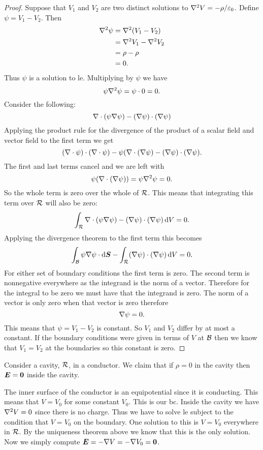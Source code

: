     \begin{proof}
        Suppose that \(V_1\) and \(V_2\) are two distinct solutions to \(\nabla^2 V = -\rho/\varepsilon_0\).
        Define \(\psi = V_1 - V_2\).
        Then
        \begin{align*}
            \nabla^2 \psi &= \nabla^2(V_1 - V_2)\\
            &= \nabla^2 V_1 - \nabla^2 V_2\\
            &= \rho - \rho\\
            &= 0.
        \end{align*}
        Thus \(\psi\) is a solution to \acrshort{le}.
        Multiplying by \(\psi\) we have
        \[\psi\nabla^2\psi = \psi\cdot0 = 0.\]
        Consider the following:
        \[\nabla\cdot(\psi\nabla\psi) - (\nabla\psi)\cdot(\nabla\psi)\]
        Applying the product rule for the divergence of the product of a scalar field and vector field to the first term we get
        \[(\nabla\cdot\psi)\cdot(\nabla\cdot\psi) - \psi(\nabla\cdot(\nabla\psi) - (\nabla\psi)\cdot(\nabla\psi).\]
        The first and last terms cancel and we are left with
        \[\psi(\nabla\cdot(\nabla\psi)) = \psi\nabla^2\psi = 0.\]
        So the whole term is zero over the whole of \(\mathcal{R}\).
        This means that integrating this term over \(\mathcal{R}\) will also be zero:
        \[\int_{\mathcal{R}} \nabla\cdot(\psi\nabla\psi) - (\nabla\psi)\cdot(\nabla\psi)\dd{V} = 0.\]
        Applying the divergence theorem to the first term this becomes
        \[\int_{\mathcal{B}} \psi\nabla\psi\cdot\dd{\bm{S}} - \int_{\mathcal{R}} (\nabla\psi)\cdot(\nabla\psi) \dd{V} = 0.\]
        For either set of boundary conditions the first term is zero.
        The second term is nonnegative everywhere as the integrand is the norm of a vector.
        Therefore for the integral to be zero we must have that the integrand is zero.
        The norm of a vector is only zero when that vector is zero therefore
        \[\nabla\psi = 0.\]
        This means that \(\psi = V_1 - V_2\) is constant.
        So \(V_1\) and \(V_2\) differ by at most a constant.
        If the boundary conditions were given in terms of \(V\) at \(\mathcal{B}\) then we know that \(V_1 = V_2\) at the boundaries so this constant is zero.
    \end{proof}
    
    \begin{example}
        Consider a cavity, \(\mathcal{R}\), in a conductor.
        We claim that if \(\rho = 0\) in the cavity then \(\bm{E} = \bm{0}\) inside the cavity.
        
        The inner surface of the conductor is an equipotential since it is conducting.
        This means that \(V = V_0\) for some constant \(V_0\).
        This is our \acrshort{bc}.
        Inside the cavity we have \(\nabla^2 V = 0\) since there is no charge.
        Thus we have to solve \acrshort{le} subject to the condition that \(V = V_0\) on the boundary.
        One solution to this is \(V = V_0\) everywhere in \(\mathcal{R}\).
        By the uniqueness theorem above we know that this is the only solution.
        Now we simply compute \(\bm{E} = -\nabla V = -\nabla V_0 = \bm{0}\).
    \end{example}
    
